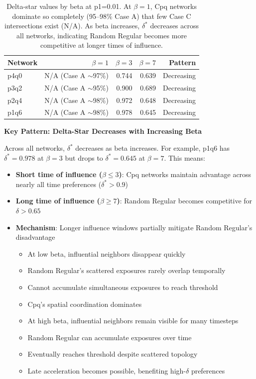 \documentclass[12pt,a4paper]{article}
\begin{document}
\begin{table}[H]
\centering
\begin{tabular}{@{}lrrrr@{}}
\toprule
\textbf{Network} & \textbf{$\beta=1$} & \textbf{$\beta=3$} & \textbf{$\beta=7$} & \textbf{Pattern} \\
\midrule
p4q0  & N/A (Case A $\sim$97\%) & 0.744 & 0.639 & Decreasing \\
p3q2  & N/A (Case A $\sim$95\%) & 0.900 & 0.689 & Decreasing \\
p2q4  & N/A (Case A $\sim$98\%) & 0.972 & 0.648 & Decreasing \\
p1q6  & N/A (Case A $\sim$98\%) & 0.978 & 0.645 & Decreasing \\
\bottomrule
\end{tabular}
\caption{Delta-star values by beta at p1=0.01. At $\beta=1$, Cpq networks dominate so completely (95--98\% Case A) that few Case C intersections exist (N/A). As beta increases, $\delta^*$ decreases across all networks, indicating Random Regular becomes more competitive at longer times of influence.}
\label{tab:deltastar_beta_p1_0.01}
\end{table}

\textbf{Key Pattern: Delta-Star Decreases with Increasing Beta}

Across all networks, $\delta^*$ decreases as beta increases. For example, p1q6 has $\delta^* = 0.978$ at $\beta=3$ but drops to $\delta^* = 0.645$ at $\beta=7$. This means:

\begin{itemize}
    \item \textbf{Short time of influence ($\beta \leq 3$)}: Cpq networks maintain advantage across nearly all time preferences ($\delta^* > 0.9$)
    \item \textbf{Long time of influence ($\beta \geq 7$)}: Random Regular becomes competitive for $\delta > 0.65$
    \item \textbf{Mechanism}: Longer influence windows partially mitigate Random Regular's disadvantage
    \begin{itemize}
        \item At low beta, influential neighbors disappear quickly
        \item Random Regular's scattered exposures rarely overlap temporally
        \item Cannot accumulate simultaneous exposures to reach threshold
        \item Cpq's spatial coordination dominates
        \item At high beta, influential neighbors remain visible for many timesteps
        \item Random Regular can accumulate exposures over time
        \item Eventually reaches threshold despite scattered topology
        \item Late acceleration becomes possible, benefiting high-$\delta$ preferences
    \end{itemize}
\end{itemize}
\end{document}
